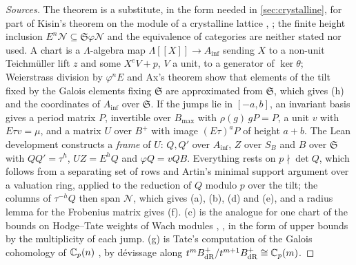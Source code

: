 \begin{proof}[Sources]
The theorem is a substitute, in the form needed in \cref{sec:crystalline}, for part of Kisin's theorem on the module of a crystalline lattice \cite{Kisin2006}, \cite[\S4]{BhattMorrowScholze2018}; the finite height inclusion $E^n\mathcal N\subseteq\mathfrak S\varphi\mathcal N$ and the equivalence of categories are neither stated nor used. A chart
is a $\Lambda$-algebra map $\Lambda[\![X]\!]\to A_{\inf}$ sending $X$ to a non-unit Teichm\"uller lift $z$ and some $X^eV+p$, $V$ a unit, to a generator of $\ker\theta$; Weierstrass division by $\varphi^nE$ and Ax's theorem \cite{Ax1970} show that elements of the tilt fixed by the Galois elements fixing $\mathfrak S$ are approximated from
$\mathfrak S$, which gives (h) and the coordinates of $A_{\inf}$ over $\mathfrak S$. If the jumps lie in $[-a,b]$, an invariant basis gives a period matrix $P$, invertible over $B_{\max}$ \cite{Colmez1998} with $\rho(g)\,gP=P$, a unit $v$ with $E\tau v=\mu$, and a matrix $U$ over $B^+$ with image $(E\tau)^aP$ of height $a+b$. The Lean development
constructs a \emph{frame} of $U$: $Q,Q'$ over $A_{\inf}$, $Z$ over $S_B$ and $B$ over $\mathfrak S$ with $QQ'=\tau^h$, $UZ=E^hQ$ and $\varphi Q=vQB$. Everything rests on $p\nmid\det Q$, which follows from a separating set of rows and Artin's minimal support argument over a valuation ring, applied to the reduction of $Q$ modulo $p$ over the tilt; the
columns of $\tau^{-h}Q$ then span $\mathcal N$, which gives (a), (b), (d) and (e), and a radius lemma for the Frobenius matrix gives (f). (c) is the analogue for one chart of the bounds on Hodge--Tate weights of Wach modules \cite{Wach1996}, \cite[\S III]{Berger2004}, in the form of upper bounds by the multiplicity of each jump. (g) is Tate's
computation of the Galois cohomology of $\mathbb{C}_p(n)$ \cite{TatePDiv1967}, by d\'evissage along $t^mB_{\rm dR}^+/t^{m+1}B_{\rm dR}^+\cong\mathbb{C}_p(m)$.
\end{proof}

